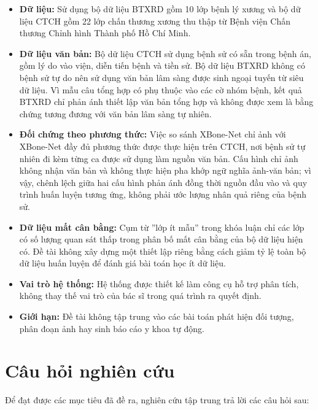 \begin{itemize}
  \item \textbf{Dữ liệu:} Sử dụng bộ dữ liệu BTXRD \cite{Yao2025} gồm 10 lớp bệnh lý xương và bộ dữ liệu CTCH gồm 22 lớp chấn thương xương thu thập từ Bệnh viện Chấn thương Chỉnh hình Thành phố Hồ Chí Minh.
  \item \textbf{Dữ liệu văn bản:} Bộ dữ liệu CTCH sử dụng bệnh sử có sẵn trong bệnh án, gồm lý do vào viện, diễn tiến bệnh và tiền sử. Bộ dữ liệu BTXRD không có bệnh sử tự do nên sử dụng văn bản lâm sàng được sinh ngoại tuyến từ siêu dữ liệu. Vì mẫu câu tổng hợp có phụ thuộc vào các cờ nhóm bệnh, kết quả BTXRD chỉ phản ánh thiết lập văn bản tổng hợp và không được xem là bằng chứng tương đương với văn bản lâm sàng tự nhiên.
  \item \textbf{Đối chứng theo phương thức:} Việc so sánh XBone-Net chỉ ảnh với XBone-Net đầy đủ phương thức được thực hiện trên CTCH, nơi bệnh sử tự nhiên đi kèm từng ca được sử dụng làm nguồn văn bản. Cấu hình chỉ ảnh không nhận văn bản và không thực hiện pha khớp ngữ nghĩa ảnh-văn bản; vì vậy, chênh lệch giữa hai cấu hình phản ánh đồng thời nguồn đầu vào và quy trình huấn luyện tương ứng, không phải ước lượng nhân quả riêng của bệnh sử.
  \item \textbf{Dữ liệu mất cân bằng:} Cụm từ ''lớp ít mẫu'' trong khóa luận chỉ các lớp có số lượng quan sát thấp trong phân bố mất cân bằng của bộ dữ liệu hiện có. Đề tài không xây dựng một thiết lập riêng bằng cách giảm tỷ lệ toàn bộ dữ liệu huấn luyện để đánh giá bài toán học ít dữ liệu.
  \item \textbf{Vai trò hệ thống:} Hệ thống được thiết kế làm công cụ hỗ trợ phân tích, không thay thế vai trò của bác sĩ trong quá trình ra quyết định.
  \item \textbf{Giới hạn:} Đề tài không tập trung vào các bài toán phát hiện đối tượng, phân đoạn ảnh hay sinh báo cáo y khoa tự động.
\end{itemize}

\section{Câu hỏi nghiên cứu}

Để đạt được các mục tiêu đã đề ra, nghiên cứu tập trung trả lời các câu hỏi sau:

